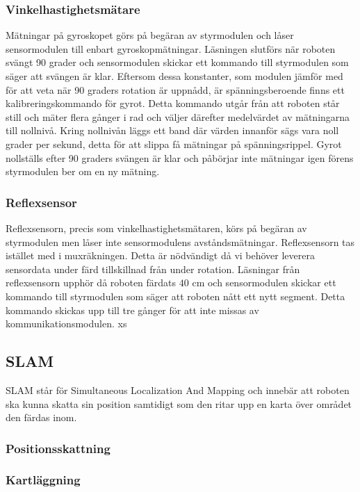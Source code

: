 ﻿\documentclass[a4paper,12pt,fleqn]{article}
\begin{document}
\subsubsection{Vinkelhastighetsmätare}
Mätningar på gyroskopet görs på begäran av styrmodulen och låser sensormodulen till enbart gyroskopmätningar. 
Läsningen slutförs när roboten svängt 90 grader och sensormodulen skickar ett kommando till styrmodulen som säger att svängen är klar. Eftersom dessa konstanter, som modulen jämför med för att veta när 90 graders rotation är uppnådd, är spänningsberoende finns ett kalibreringskommando för gyrot. Detta kommando utgår från att roboten står still och mäter flera gånger i rad och väljer därefter medelvärdet av mätningarna till nollnivå. Kring nollnivån läggs ett band där värden innanför sägs vara noll grader per sekund, detta för att slippa få mätningar på spänningsrippel. Gyrot nollställs efter 90 graders svängen är klar och påbörjar inte mätningar igen förens styrmodulen ber om en ny mätning.

\subsubsection{Reflexsensor}
Reflexsensorn, precis som vinkelhastighetsmätaren, körs på begäran av styrmodulen men låser inte sensormodulens avståndsmätningar. Reflexsensorn tas istället med i muxräkningen. Detta är nödvändigt då vi behöver leverera sensordata under färd tillskillnad från under rotation. Läsningar från reflexsensorn upphör då roboten färdats $40$ cm och sensormodulen skickar ett kommando till styrmodulen
som säger att roboten nått ett nytt segment. Detta kommando skickas upp till tre gånger för att inte missas av kommunikationsmodulen. xs

\subsection{SLAM}

SLAM står för Simultaneous Localization And Mapping och innebär att roboten ska kunna skatta sin position samtidigt som den ritar upp en karta över området den färdas inom.

\subsubsection{Positionsskattning}
\subsubsection{Kartläggning}
\end{document}
